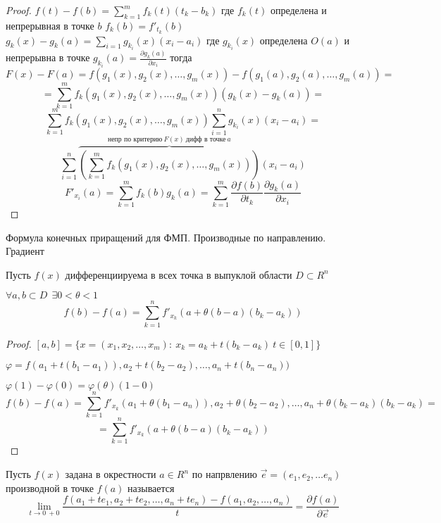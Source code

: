 \begin{proof}
  $f(t) - f(b) = \sum_{k=1}^m f_k(t)(t_k - b_k)$ где $f_k(t)$ определена и
  непрерывная в точке $b$ $f_k(b) = f'_{t_k}(b)$ $g_k(x) - g_k(a) =
  \sum_{i=1}g_{k_i}(x)(x_i - a_i)$ где $g_{k_i}(x)$ определена $O(a)$ и
  непрерывна в точке $g_{k_i}(a) = \frac{\partial g_k(a)}{\partial x_i}$ тогда
  $$
  F(x) - F(a) = f(g_1(x), g_2(x), \ldots, g_m(x)) - f(g_1(a), g_2(a),
  \ldots, g_m(a)) =
  $$
  $$
  = \sum_{k=1}^m f_k(g_1(x), g_2(x), \ldots, g_m(x)) (g_k(x) - g_k(a)) =
  $$
  $$
  \sum_{k=1}^m f_k(g_1(x), g_2(x), \ldots, g_m(x)) \sum_{i=1}^n g_{k_i}(x)
  (x_i - a_i)=
  $$
  $$
  \sum_{i=1}^n \overbrace{\left( \sum_{k=1}^m f_k(g_1(x), g_2(x), \ldots,
  g_m(x)) \right)}^{\text{непр по критерию} ~ F(x) ~ \text{дифф в точке} ~ a}
  (x_i - a_i)
  $$
  $$
  F'_{x_i}(a) = \sum_{k=1}^m f_k(b) g_k(a) = \sum_{k=1}^m
  \frac{\partial f(b)}{\partial t_k} \frac{\partial g_k(a)}{\partial x_i}
  $$
\end{proof}

\begin{title}[\Large]
  Формула конечных приращений для ФМП. Производные по направлению. Градиент
\end{title}

\begin{theorem}
  Пусть $f(x)$ дифференциируема в всех точка в выпуклой области $D \subset R^n$

  $\forall a,b \subset D ~~ \exists 0 < \theta < 1$
  $$
  f(b) - f(a) = \sum_{k=1}^n f'_{x_k} (a + \theta(b-a)(b_k-a_k))
  $$
\end{theorem}

\begin{proof}
  $[a,b] = \{x = (x_1, x_2, \ldots, x_m): ~ x_k = a_k + t(b_k - a_k) ~
  t \in [0,1]\}$

  $\varphi = f(a_1 + t(b_1 - a_1)), a_2 + t(b_2 - a_2), \ldots,
  a_n + t(b_n-a_n))$

  $\varphi(1) - \varphi(0) = \varphi(\theta) (1 - 0)$
  $$
  f(b) - f(a) = \sum_{k=1}^n f'_{x_k}(a_1 + \theta(b_1 - a_n)),
  a_2 + \theta(b_2 - a_2), \ldots, a_n + \theta(b_k - a_k) (b_k - a_k) =
  $$
  $$
  = \sum_{k=1}^n f'_{x_k}(a + \theta(b-a)(b_k - a_k))
  $$
\end{proof}

\begin{define}
  Пусть $f(x)$ задана в окрестности $a \in R^n$ по напрвлению
  $\vec e = (e_1, e_2, \ldots e_n)$ производной в точке $f(a)$ называется
  $$
  \lim_{t \to 0 ~ +0} \frac{f(a_1 + te_1, a_2 + te_2, \ldots, a_n + te_n) -
  f(a_1, a_2, \ldots, a_n)}{t} = \frac{\partial f(a)}{\partial \vec e}
  $$
\end{define}

